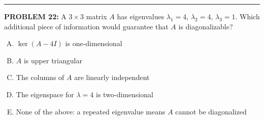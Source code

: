\documentclass[12pt]{amsart}
\newcommand{\divider}{
  \vspace{-1em} %
  \noindent
  \raisebox{-0.15ex}{\textbullet}%
  \hspace{0.5em}%
  \rule[0.5ex]{0.95\textwidth}{1.0pt}%
  \hspace{0.5em}%
  \raisebox{-0.15ex}{\textbullet}%
  \vspace{0em} %
}
\begin{document}
\divider


{\bf PROBLEM 22:}
%
A $3 \times 3$ matrix $A$ has eigenvalues $\lambda_1 = 4$, 
$\lambda_2 = 4$, $\lambda_3 = 1$.
%
Which additional piece of information would guarantee that $A$ is 
diagonalizable?
\begin{enumerate}[(A)]
\item $\ker(A - 4I)$ is one-dimensional
\item $A$ is upper triangular
\item The columns of $A$ are linearly independent
\item The eigenspace for $\lambda = 4$ is two-dimensional
\item None of the above: a repeated eigenvalue means $A$ cannot 
      be diagonalized
\end{enumerate}
%
%
\end{document}

